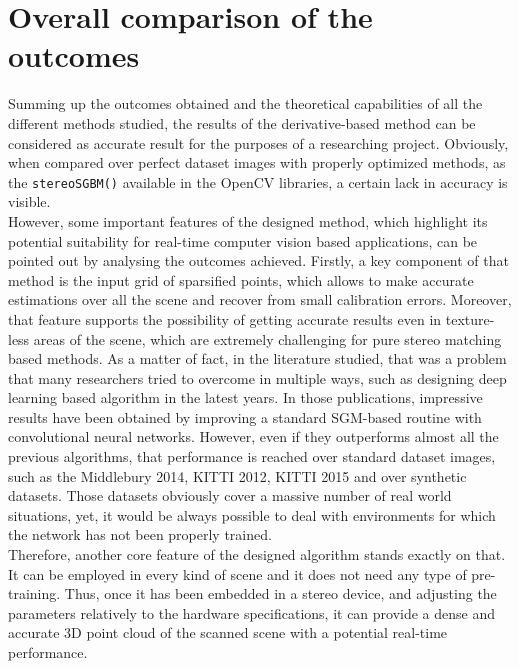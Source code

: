 \section{Overall comparison of the outcomes}
\label{section:method-comparison}

Summing up the outcomes obtained and the theoretical capabilities of all the different methods studied, the results of the derivative-based method can be considered as accurate result for the purposes of a researching project.
Obviously, when compared over perfect dataset images with properly optimized methods, as the \texttt{stereoSGBM()} available in the OpenCV libraries, a certain lack in accuracy is visible.\\
However, some important features of the designed method, which highlight its potential suitability for real-time computer vision based applications, can be pointed out by analysing the outcomes achieved.
Firstly, a key component of that method is the input grid of sparsified points, which allows to make accurate estimations over all the scene and recover from small calibration errors.
Moreover, that feature supports the possibility of getting accurate results even in texture-less areas of the scene, which are extremely challenging for pure stereo matching based methods.
As a matter of fact, in the literature studied, that was a problem that many researchers tried to overcome in multiple ways, such as designing deep learning based algorithm in the latest years.
In those publications, impressive results have been obtained by improving a standard SGM-based routine with convolutional neural networks.
However, even if they outperforms almost all the previous algorithms, that performance is reached over standard dataset images, such as the Middlebury 2014, KITTI 2012, KITTI 2015 and over synthetic datasets.
Those datasets obviously cover a massive number of real world situations, yet, it would be always possible to deal with environments for which the network has not been properly trained. \\  
Therefore, another core feature of the designed algorithm stands exactly on that.
It can be employed in every kind of scene and it does not need any type of pre-training.
Thus, once it has been embedded in a stereo device, and adjusting the parameters relatively to the hardware specifications, it can provide a dense and accurate 3D point cloud of the scanned scene with a potential real-time performance.

